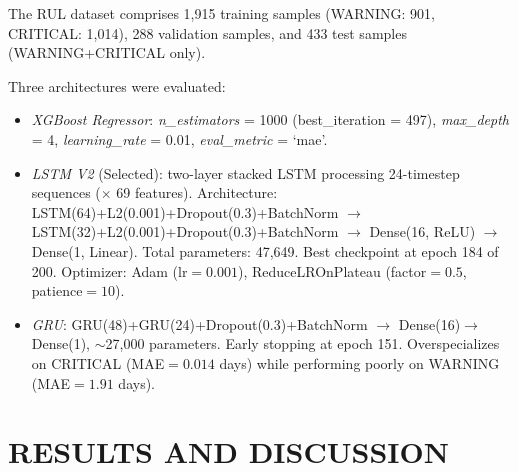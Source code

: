 \documentclass[conference]{IEEEtran}
\begin{document}
The RUL dataset comprises 1,915 training samples (WARNING: 901, CRITICAL:
1,014), 288 validation samples, and 433 test samples (WARNING+CRITICAL only).

Three architectures were evaluated:

\begin{itemize}
\item \textit{XGBoost Regressor}: \textit{n\_estimators} = 1000
  (best\_iteration = 497), \textit{max\_depth} = 4, \textit{learning\_rate} = 0.01,
  \textit{eval\_metric} = `mae'.

\item \textit{LSTM V2} (Selected): two-layer stacked LSTM processing
  24-timestep sequences ($\times$ 69 features). Architecture:
  LSTM(64)+L2(0.001)+Dropout(0.3)+BatchNorm $\rightarrow$
  LSTM(32)+L2(0.001)+Dropout(0.3)+BatchNorm $\rightarrow$
  Dense(16, ReLU) $\rightarrow$ Dense(1, Linear).
  Total parameters: 47,649. Best checkpoint at epoch 184 of 200.
  Optimizer: Adam (lr$=0.001$), ReduceLROnPlateau (factor$=0.5$,
  patience$=10$).

\item \textit{GRU}: GRU(48)+GRU(24)+Dropout(0.3)+BatchNorm $\rightarrow$
  Dense(16)$\rightarrow$Dense(1), $\sim$27,000 parameters. Early stopping
  at epoch 151. Overspecializes on CRITICAL (MAE$=0.014$ days) while
  performing poorly on WARNING (MAE$=1.91$ days).
\end{itemize}



\section{RESULTS AND DISCUSSION}
\label{sec:results}
\end{document}

